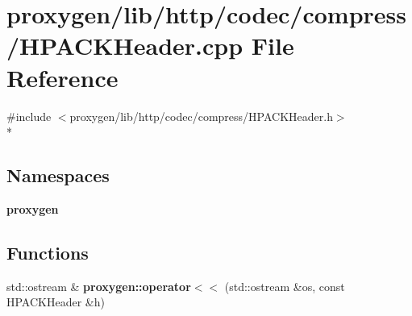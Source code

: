 \section{proxygen/lib/http/codec/compress/\+H\+P\+A\+C\+K\+Header.cpp File Reference}
\label{HPACKHeader_8cpp}
{\ttfamily \#include $<$proxygen/lib/http/codec/compress/\+H\+P\+A\+C\+K\+Header.\+h$>$}\\*
\subsection*{Namespaces}
\begin{DoxyCompactItemize}
\item 
 {\bf proxygen}
\end{DoxyCompactItemize}
\subsection*{Functions}
\begin{DoxyCompactItemize}
\item 
std\+::ostream \& {\bf proxygen\+::operator$<$$<$} (std\+::ostream \&os, const H\+P\+A\+C\+K\+Header \&h)
\end{DoxyCompactItemize}
